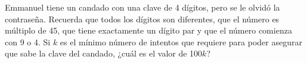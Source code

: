 Emmanuel tiene un candado con una clave de 4 dígitos, pero se le olvidó la contraseña. Recuerda que todos los dígitos son diferentes, que el número es múltiplo de 45, que tiene exactamente un dígito par y que el número comienza con 9 o 4. Si $k$ es el mínimo número de intentos que requiere para poder asegurar que sabe la clave del candado, ¿cuál es el valor de 100$k$?